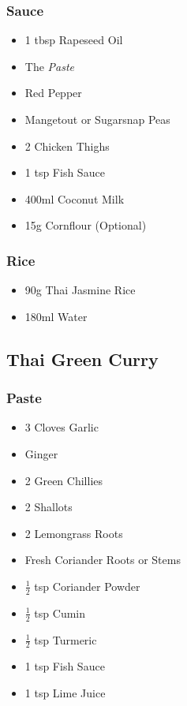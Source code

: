 \documentclass[11pt, english]{article}
\begin{document}
		\subsubsection*{Sauce}

	\begin{itemize}
        \setlength\itemsep{0cm}
                \item 1 tbsp Rapeseed Oil
                \item The \textit{Paste}
                \item Red Pepper
		\item Mangetout or Sugarsnap Peas
                \item 2 Chicken Thighs
                \item 1 tsp Fish Sauce
                \item 400ml Coconut Milk
		\item 15g Cornflour (Optional)
        \end{itemize}

		\subsubsection*{Rice}

	\begin{itemize}
        \setlength\itemsep{0cm}
                \item 90g Thai Jasmine Rice
		\item 180ml Water
        \end{itemize}

\newpage

	\subsection{Thai Green Curry}

		\subsubsection*{Paste}

	\begin{itemize}
        \setlength\itemsep{0cm}
                \item 3 Cloves Garlic
                \item Ginger
                \item 2 Green Chillies
                \item 2 Shallots
                \item 2 Lemongrass Roots
                \item Fresh Coriander Roots or Stems
		\item $\frac{1}{2}$ tsp Coriander Powder
                \item $\frac{1}{2}$ tsp Cumin
		\item $\frac{1}{2}$ tsp Turmeric
                \item 1 tsp Fish Sauce
                \item 1 tsp Lime Juice
        \end{itemize}
\end{document}
